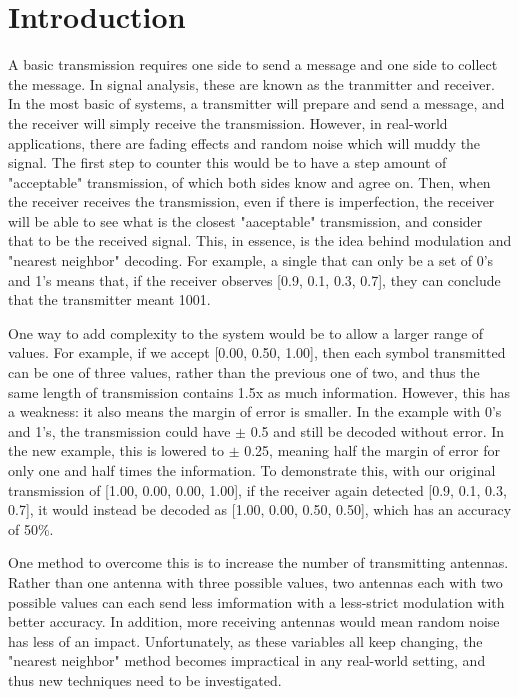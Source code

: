 \documentclass[conference]{IEEEtran}
\begin{document}
\IEEEpeerreviewmaketitle

\section{Introduction}
A basic transmission requires one side to send a message and one side to collect the message. In signal analysis, these are known as the tranmitter and receiver. In the most basic of systems, a transmitter will prepare and send a message, and the receiver will simply receive the transmission. However, in real-world applications, there are fading effects and random noise which will muddy the signal. The first step to counter this would be to have a step amount of "acceptable" transmission, of which both sides know and agree on. Then, when the receiver receives the transmission, even if there is imperfection, the receiver will be able to see what is the closest "aaceptable" transmission, and consider that to be the received signal. This, in essence, is the idea behind modulation and "nearest neighbor" decoding. For example, a single that can only be a set of 0's and 1's means that, if the receiver observes [0.9, 0.1, 0.3, 0.7], they can conclude that the transmitter meant 1001. \par
One way to add complexity to the system would be to allow a larger range of values. For example, if we accept [0.00, 0.50, 1.00], then each symbol transmitted can be one of three values, rather than the previous one of two, and thus the same length of transmission contains 1.5x as much information. However, this has a weakness: it also means the margin of error is smaller. In the example with 0's and 1's, the transmission could have $\pm$ 0.5 and still be decoded without error. In the new example, this is lowered to $\pm$ 0.25, meaning half the margin of error for only one and half times the information. To demonstrate this, with our original transmission of [1.00, 0.00, 0.00, 1.00], if the receiver again detected [0.9, 0.1, 0.3, 0.7], it would instead be decoded as [1.00, 0.00, 0.50, 0.50], which has an accuracy of 50\%.\par
One method to overcome this is to increase the number of transmitting antennas. Rather than one antenna with three possible values, two antennas each with two possible values can each send less imformation with a less-strict modulation with better accuracy. In addition, more receiving antennas would mean random noise has less of an impact. Unfortunately, as these variables all keep changing, the "nearest neighbor" method becomes impractical in any real-world setting, and thus new techniques need to be investigated.\par
\end{document}
